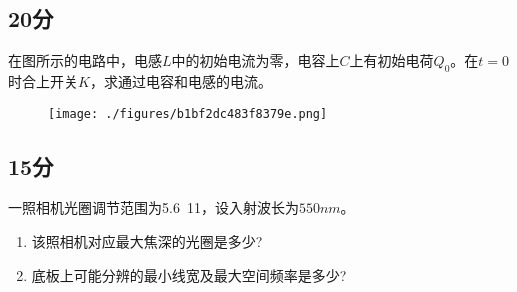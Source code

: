 \subsection{20分}
在图所示的电路中，电感$L$中的初始电流为零，电容上$C$上有初始电荷$Q_0$。在$t=0$时合上开关$K$，求通过电容和电感的电流。
\begin{figure}[ht]
\centering
\texttt{[image: ./figures/b1bf2dc483f8379e.png]}
\caption{} \label{fig_PKU007_1}
\end{figure}
\subsection{15分}
一照相机光圈调节范围为5.6~11，设入射波长为$550nm$。
\begin{enumerate}
\item 该照相机对应最大焦深的光圈是多少?
\item 底板上可能分辨的最小线宽及最大空间频率是多少?
\end{enumerate}
